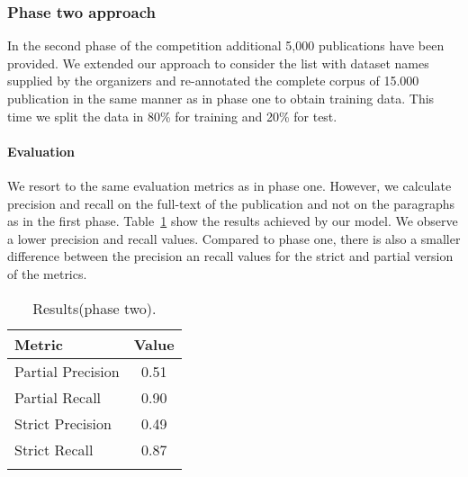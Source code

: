 \subsubsection{Phase two approach}
In the second phase of the competition additional 5,000 publications have been provided. We extended our approach to consider the list with dataset names supplied by the organizers and re-annotated the complete corpus of 15.000 publication in the same manner as in phase one to obtain training data. This time we split the data in 80\% for training and 20\% for test.   

\paragraph{Evaluation}
We resort to the same evaluation metrics as in phase one. However, we calculate precision and recall on the full-text of the publication and not on the paragraphs as in the first phase. Table~\ref{table:dataset-mention-eval-phase-two} show the results achieved by our model. We observe a lower precision and recall values. Compared to phase one, there is also a smaller difference between the precision an recall values for the strict and partial version of the metrics. 
\begin{table}[hb]
    \center 
    \caption{Results(phase two).} 
    \begin{tabular}{lc} 
        \toprule
        Metric  & Value \\
        \midrule
        Partial Precision   & 0.51 \\
        Partial Recall      & 0.90 \\
        \midrule
        Strict Precision    & 0.49 \\
        Strict Recall       & 0.87 \\ 
        \bottomrule \\ 
    \end{tabular} 
    \label{table:dataset-mention-eval-phase-two} 
\end{table}

